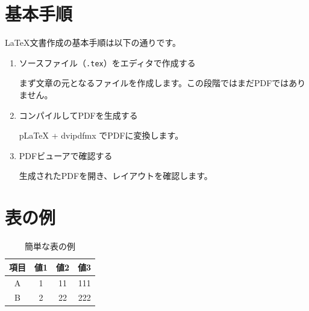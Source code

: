 \documentclass[dvipdfmx,a4paper,12pt]{jsarticle}
\begin{document}
\section{基本手順}

\LaTeX 文書作成の基本手順は以下の通りです。

\begin{enumerate}
  \item ソースファイル（\texttt{.tex}）をエディタで作成する
  
  まず文章の元となるファイルを作成します。この段階ではまだPDFではありません。

  \item コンパイルしてPDFを生成する
  
  pLaTeX + dvipdfmx でPDFに変換します。

  \item PDFビューアで確認する
  
  生成されたPDFを開き、レイアウトを確認します。
\end{enumerate}


\clearpage


\section{表の例}

\begin{table}[ht]

\caption{簡単な表の例}
\centering

\begin{tabular}{cccc}

\toprule
項目 & 値1 & 値2 & 値3 \\
\midrule
A & 1 & 11 & 111 \\
B & 2 & 22 & 222 \\
\bottomrule

\end{tabular}

\end{table}
\end{document}
